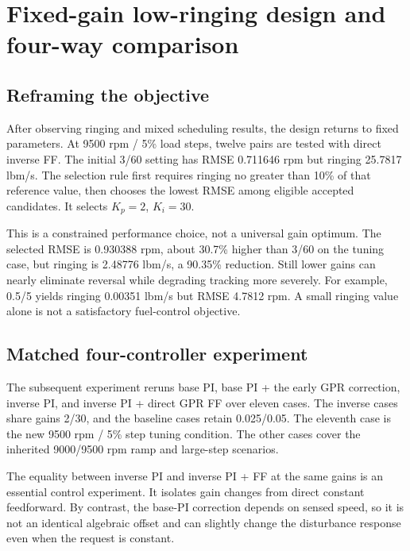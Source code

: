 \section{Fixed-gain low-ringing design and four-way comparison}
\label{ch:fixed}
\subsection{Reframing the objective}
After observing ringing and mixed scheduling results, the design returns to fixed parameters. At 9500 rpm / 5\% load steps, twelve pairs are tested with direct inverse FF. The initial 3/60 setting has RMSE 0.711646 rpm but ringing 25.7817 lbm/s. The selection rule first requires ringing no greater than 10\% of that reference value, then chooses the lowest RMSE among eligible accepted candidates. It selects $K_p=2$, $K_i=30$.

This is a constrained performance choice, not a universal gain optimum. The selected RMSE is 0.930388 rpm, about 30.7\% higher than 3/60 on the tuning case, but ringing is 2.48776 lbm/s, a 90.35\% reduction. Still lower gains can nearly eliminate reversal while degrading tracking more severely. For example, 0.5/5 yields ringing 0.00351 lbm/s but RMSE 4.7812 rpm. A small ringing value alone is not a satisfactory fuel-control objective.



\subsection{Matched four-controller experiment}
The subsequent experiment reruns base PI, base PI + the early GPR correction, inverse PI, and inverse PI + direct GPR FF over eleven cases. The inverse cases share gains 2/30, and the baseline cases retain 0.025/0.05. The eleventh case is the new 9500 rpm / 5\% step tuning condition. The other cases cover the inherited 9000/9500 rpm ramp and large-step scenarios.


The equality between inverse PI and inverse PI + FF at the same gains is an essential control experiment. It isolates gain changes from direct constant feedforward. By contrast, the base-PI correction depends on sensed speed, so it is not an identical algebraic offset and can slightly change the disturbance response even when the request is constant.

